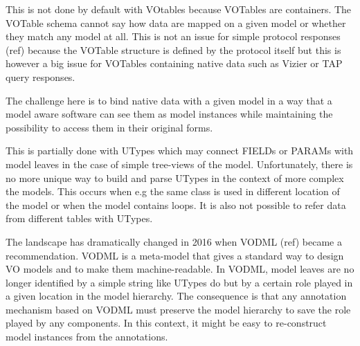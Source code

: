 \documentclass[11pt,a4paper]{ivoa}
\begin{document}
This is not done by default with VOtables because VOTables are containers. The VOTable schema cannot say how data are mapped on a given model or whether they match any model at all. This is not an issue for simple protocol responses (ref) because the VOTable structure is defined by the protocol itself but this is however a big issue for VOTables containing native data such as Vizier  or TAP query responses.

The challenge here is to bind native data with a given model in a way that a model aware software can see them as model instances while maintaining the possibility to access them in their original forms.

This is partially done with UTypes which may connect FIELDs or PARAMs with model leaves in the case of simple tree-views of the model. Unfortunately, there is no more unique  way to build and parse UTypes in the context of more complex the models. This occurs when e.g the same class is used in different location of the model or when the model contains loops. It is also not possible to refer data from different tables with  UTypes.


The landscape has dramatically changed in 2016 when VODML (ref) became a recommendation. VODML is a meta-model that gives a standard way to design VO models and to make them machine-readable.
In VODML, model leaves are no longer identified by a simple string like UTypes do but by a certain role played in a given location in the model hierarchy.
The consequence is that any annotation mechanism based on VODML must preserve the model hierarchy to save the role played by any components. In this context, it might be easy to re-construct model instances from the annotations. 
\end{document}
